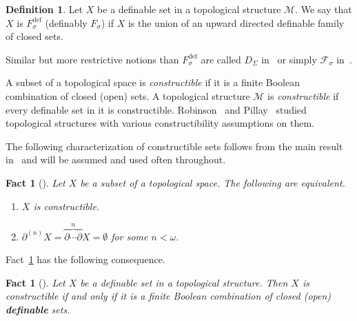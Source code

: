 \documentclass[12pt]{article}
\newcommand{\Mm}{\mathcal{M}}
\newcommand{\dF}{\ensuremath{F_\sigma^{\text{def}}}}
\newcommand{\dG}{\ensuremath{G_\delta^{\text{def}}}}
\newtheorem{fact}[theorem]{Fact}
\theoremstyle{definition}
\newtheorem{definition}[theorem]{Definition}
\theoremstyle{remark}
\begin{document}
\begin{definition}
Let $X$ be a definable set in a topological structure $\Mm$. We say that $X$ is $\dF$ (definably $F_\sigma$) if $X$ is the union of an upward directed definable family of closed sets. 
\end{definition}


Similar but more restrictive notions than $\dF$ are called $D_\Sigma$ in~\cite{DMS10} or simply $\mathcal{F}_\sigma$ in~\cite{def-baire}. 

A subset of a topological space is \emph{constructible} if it is a finite Boolean combination of closed (open) sets. A topological structure $\Mm$ is \emph{constructible} if every definable set in it is constructible. Robinson~\cite{rob73} and Pillay~\cite{pillay87} studied topological structures with various constructibility assumptions on them. 

The following characterization of constructible sets follows from the main result in~\cite{MR01} and will be assumed and used often throughout.  

\begin{fact}[\cite{MR01}]\label{fct:constructible0}
Let $X$ be a subset of a topological space. The following are equivalent. 
\begin{enumerate}[(1)]
    \item $X$ is constructible. 
    \item $\partial^{(n)}X = \overbrace{\partial \cdots \partial}^{n} X=\emptyset$ for some $n<\omega$. 
\end{enumerate}
\end{fact}

Fact~\ref{fct:constructible0} has the following consequence. 

\begin{fact}[\cite{MR01}]\label{fct:constructible1}
Let $X$ be a definable set in a topological structure. Then $X$ is constructible if and only if it is a finite Boolean combination of closed (open) \textbf{definable} sets.
\end{fact}
\end{document}
